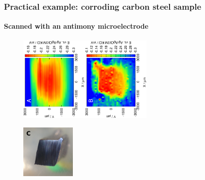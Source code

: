 \documentclass{beamer}
\begin{document}
\begin{frame}
\begin{columns}[T]
\begin{column}{.2\textwidth}
\end{column}%
\begin{column}{.2\textwidth}
\begin{minipage}[c][0.75\textheight][c]{\linewidth}
\centering
\end{minipage}
\end{column}%
\end{columns}
\end{frame}

\begin{frame}
\frametitle{Practical example: corroding carbon steel sample}
\framesubtitle{Scanned with an antimony microelectrode}
\begin{figure}
\centering
\includegraphics[trim = 10mm 30mm 0mm 10mm, clip, width=0.3\textwidth, angle=-90]{16012906.eps}\includegraphics[trim = 10mm 30mm 0mm 10mm, clip, width=0.3\textwidth, angle=-90]{16012906_deconvoluted.eps}

\includegraphics[width=0.24\textwidth]{cs_cut.jpg}

\end{figure}
\end{frame}
\end{document}
